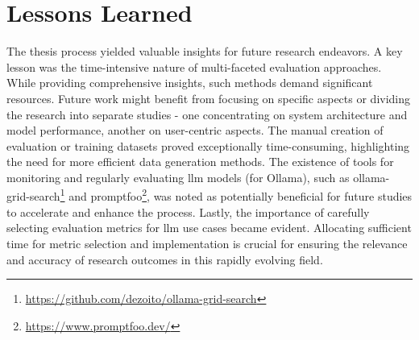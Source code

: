 \section{Lessons Learned}
The thesis process yielded valuable insights for future research endeavors. A key lesson was the time-intensive nature of multi-faceted evaluation approaches. 
While providing comprehensive insights, such methods demand significant resources. 
Future work might benefit from focusing on specific aspects or dividing the research into separate studies - one concentrating on system architecture and model performance, another on user-centric aspects. 
The manual creation of evaluation or training datasets proved exceptionally time-consuming, highlighting the need for more efficient data generation methods. 
The existence of tools for monitoring and regularly evaluating \gls{llm} models (for Ollama), such as ollama-grid-search\footnote{\url{https://github.com/dezoito/ollama-grid-search}} and promptfoo\footnote{\url{https://www.promptfoo.dev/}}, was noted as potentially beneficial for future studies to accelerate and enhance the process. 
Lastly, the importance of carefully selecting evaluation metrics for \gls{llm} use cases became evident. Allocating sufficient time for metric selection and implementation is crucial for ensuring the relevance and accuracy of research outcomes in this rapidly evolving field.

